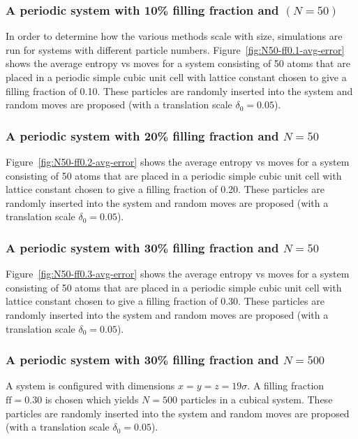 \documentclass[letterpaper,twocolumn,amsmath,amssymb,pre,aps,10pt]{revtex4-1}
\begin{document}
\subsubsection{A periodic system with 10\% filling fraction and $(N = 50)$}
In order to determine how the various methods scale with size,
simulations are run for systems with different particle numbers.
Figure~\ref{fig:N50-ff0.1-avg-error} shows the average entropy vs moves for
a system consisting of 50 atoms that are placed in a periodic simple cubic unit
cell with lattice constant chosen to give a filling fraction of 0.10.  These particles
are randomly inserted into the system and random moves are proposed (with
a translation scale $\delta_0 = 0.05$).

\subsubsection{A periodic system with 20\% filling fraction and $N = 50$}

Figure~\ref{fig:N50-ff0.2-avg-error} shows the average entropy vs moves for
a system consisting of 50 atoms that are placed in a periodic simple cubic unit
cell with lattice constant chosen to give a filling fraction of 0.20.  These particles
are randomly inserted into the system and random moves are proposed (with
a translation scale $\delta_0 = 0.05$).

\subsubsection{A periodic system with 30\% filling fraction and $N = 50$}

Figure~\ref{fig:N50-ff0.3-avg-error} shows the average entropy vs moves for
a system consisting of 50 atoms that are placed in a periodic simple cubic unit
cell with lattice constant chosen to give a filling fraction of 0.30.  These particles
are randomly inserted into the system and random moves are proposed (with
a translation scale $\delta_0 = 0.05$).

\subsubsection{A periodic system with 30\% filling fraction and $N = 500$}

A system is configured with dimensions $x = y = z = 19\sigma$.  A
filling fraction $\text{ff} = 0.30$ is chosen which yields $N = 500$
particles in a cubical system.  These particles are randomly inserted
into the system and random moves are proposed (with a translation scale
$\delta_0 = 0.05$).
\end{document}
